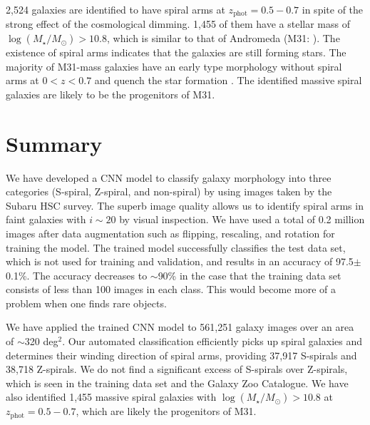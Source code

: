 \documentclass[a4paper,fleqn,usenatbib]{mnras}
\begin{document}
2,524 galaxies are identified to have spiral arms at $z_\mathrm{phot}=0.5-0.7$ in spite of the strong effect of the cosmological dimming.
1,455 of them have a stellar mass of $\log(M_\star/M_\odot)>10.8$, which is similar to that of Andromeda (M31: \citealt{2006MNRAS.366..996G}).
The existence of spiral arms indicates that the galaxies are still forming stars.
The majority of M31-mass galaxies have an early type morphology without spiral arms at $0<z<0.7$ and quench the star formation \citep{2015ApJ...803...26P}.
The identified massive spiral galaxies are likely to be the progenitors of M31.

\section{Summary}

We have developed a CNN model to classify galaxy morphology into three categories (S-spiral, Z-spiral, and non-spiral) by using images taken by the Subaru HSC survey.
The superb image quality allows us to identify spiral arms in faint galaxies with $i\sim20$ by visual inspection.
We have used a total of 0.2 million images after data augmentation such as flipping, rescaling, and rotation for training the model.
The trained model successfully classifies the test data set, which is not used for training and validation, and results in an accuracy of 97.5$\pm$0.1\%.
The accuracy decreases to $\sim$90\% in the case that the training data set consists of less than 100 images in each class.
This would become more of a problem when one finds rare objects. 

We have applied the trained CNN model to 561,251 galaxy images over an area of $\sim$320 deg$^2$.
Our automated classification efficiently picks up spiral galaxies and determines their winding direction of spiral arms, providing 37,917 S-spirals and 38,718 Z-spirals.
We do not find a significant excess of S-spirals over Z-spirals, which is seen in the training data set and the Galaxy Zoo Catalogue.
We have also identified 1,455 massive spiral galaxies with $\log(M_\star/M_\odot)>10.8$ at $z_\mathrm{phot}=0.5-0.7$, which are likely the progenitors of M31.
 
\end{document}
